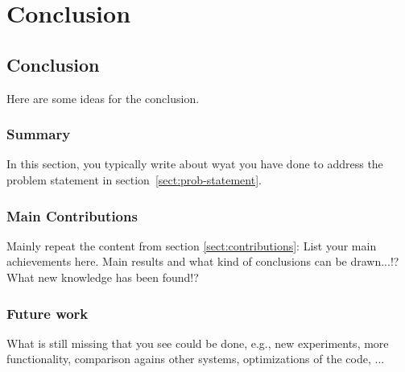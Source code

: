 \part{Conclusion}  
                  
\chapter{Conclusion}\label{chap:concl}

Here are some ideas for the conclusion.

\section{Summary}

In this section, you typically write about wyat you have done to
address the problem statement in section~\ref{sect:prob-statement}.


\section{Main Contributions}

Mainly repeat the content from section \ref{sect:contributions}:
List your main achievements here. Main results and what kind of
conclusions can be drawn...!? What new knowledge has been found!?
 
\section{Future work}

What is still missing that you see could be done, e.g., new
experiments, more functionality, comparison agains other systems,
optimizations of the code, ...


